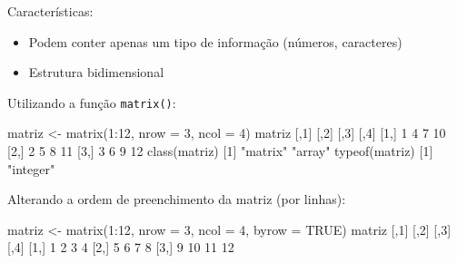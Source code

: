 \documentclass[
  10pt,
  a4paper]{book}
\newenvironment{Shaded}{\begin{snugshade}}{\end{snugshade}}
\newcommand{\AttributeTok}[1]{\textcolor[rgb]{0.77,0.63,0.00}{#1}}
\newcommand{\ConstantTok}[1]{\textcolor[rgb]{0.00,0.00,0.00}{#1}}
\newcommand{\DecValTok}[1]{\textcolor[rgb]{0.00,0.00,0.81}{#1}}
\newcommand{\FunctionTok}[1]{\textcolor[rgb]{0.00,0.00,0.00}{#1}}
\newcommand{\NormalTok}[1]{#1}
\newcommand{\OtherTok}[1]{\textcolor[rgb]{0.56,0.35,0.01}{#1}}
\newcommand{\SpecialCharTok}[1]{\textcolor[rgb]{0.00,0.00,0.00}{#1}}
\newcommand{\StringTok}[1]{\textcolor[rgb]{0.31,0.60,0.02}{#1}}
\providecommand{\tightlist}{%
  \setlength{\itemsep}{0pt}\setlength{\parskip}{0pt}}
\begin{document}
Características:

\begin{itemize}
\tightlist
\item
  Podem conter apenas um tipo de informação (números, caracteres)
\item
  Estrutura bidimensional
\end{itemize}

Utilizando a função \texttt{matrix()}:

\begin{Shaded}
\begin{Highlighting}[]
\NormalTok{matriz }\OtherTok{\textless{}{-}} \FunctionTok{matrix}\NormalTok{(}\DecValTok{1}\SpecialCharTok{:}\DecValTok{12}\NormalTok{, }\AttributeTok{nrow =} \DecValTok{3}\NormalTok{, }\AttributeTok{ncol =} \DecValTok{4}\NormalTok{)}
\NormalTok{matriz}
\NormalTok{     [,}\DecValTok{1}\NormalTok{] [,}\DecValTok{2}\NormalTok{] [,}\DecValTok{3}\NormalTok{] [,}\DecValTok{4}\NormalTok{]}
\NormalTok{[}\DecValTok{1}\NormalTok{,]    }\DecValTok{1}    \DecValTok{4}    \DecValTok{7}   \DecValTok{10}
\NormalTok{[}\DecValTok{2}\NormalTok{,]    }\DecValTok{2}    \DecValTok{5}    \DecValTok{8}   \DecValTok{11}
\NormalTok{[}\DecValTok{3}\NormalTok{,]    }\DecValTok{3}    \DecValTok{6}    \DecValTok{9}   \DecValTok{12}
\FunctionTok{class}\NormalTok{(matriz)}
\NormalTok{[}\DecValTok{1}\NormalTok{] }\StringTok{"matrix"} \StringTok{"array"} 
\FunctionTok{typeof}\NormalTok{(matriz)}
\NormalTok{[}\DecValTok{1}\NormalTok{] }\StringTok{"integer"}
\end{Highlighting}
\end{Shaded}

Alterando a ordem de preenchimento da matriz (por linhas):

\begin{Shaded}
\begin{Highlighting}[]
\NormalTok{matriz }\OtherTok{\textless{}{-}} \FunctionTok{matrix}\NormalTok{(}\DecValTok{1}\SpecialCharTok{:}\DecValTok{12}\NormalTok{, }\AttributeTok{nrow =} \DecValTok{3}\NormalTok{, }\AttributeTok{ncol =} \DecValTok{4}\NormalTok{, }\AttributeTok{byrow =} \ConstantTok{TRUE}\NormalTok{)}
\NormalTok{matriz}
\NormalTok{     [,}\DecValTok{1}\NormalTok{] [,}\DecValTok{2}\NormalTok{] [,}\DecValTok{3}\NormalTok{] [,}\DecValTok{4}\NormalTok{]}
\NormalTok{[}\DecValTok{1}\NormalTok{,]    }\DecValTok{1}    \DecValTok{2}    \DecValTok{3}    \DecValTok{4}
\NormalTok{[}\DecValTok{2}\NormalTok{,]    }\DecValTok{5}    \DecValTok{6}    \DecValTok{7}    \DecValTok{8}
\NormalTok{[}\DecValTok{3}\NormalTok{,]    }\DecValTok{9}   \DecValTok{10}   \DecValTok{11}   \DecValTok{12}
\end{Highlighting}
\end{Shaded}
\end{document}
